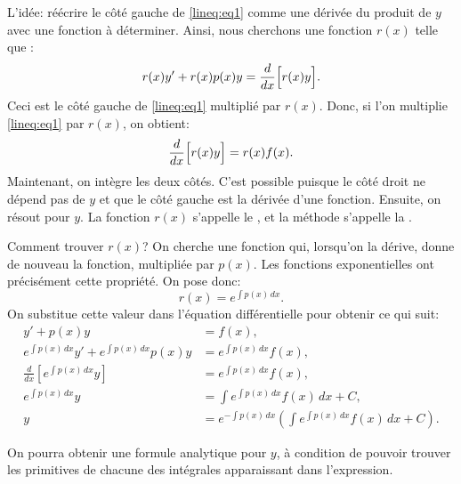 L'idée: réécrire le côté gauche de  \eqref{lineq:eq1} comme une dérivée du produit de $y$ avec une fonction à déterminer.
Ainsi, nous cherchons une fonction $r(x)$ telle que :
\begin{equation*}
	r(x) y' + r(x) p(x) y = \frac{d}{dx}\Bigl[ r(x) y \Bigr].
\end{equation*}
Ceci est le côté gauche de \eqref{lineq:eq1} multiplié par $r(x)$.
Donc, si l'on multiplie \eqref{lineq:eq1} par $r(x)$, on obtient:
\begin{equation*}
	\frac{d}{dx}\Bigl[ r(x) y \Bigr] = r(x)f(x) .
\end{equation*}
Maintenant, on intègre les deux côtés.
C'est possible puisque le côté droit ne dépend pas de $y$ et que le côté gauche est la dérivée d'une fonction.
Ensuite, on résout pour  $y$.
La fonction $r(x)$ s'appelle le \emph{}, et la méthode s'appelle la
\emph{}.

Comment trouver $r(x)$?  On cherche une fonction qui, lorsqu'on la dérive, donne  de nouveau la fonction, multipliée par $p(x)$.
Les fonctions exponentielles ont précisément cette propriété.  On pose donc:
%
\begin{equation*}
r(x) = e^{\int p(x) \,dx} .
\end{equation*}
On substitue cette valeur dans l'équation différentielle pour obtenir ce qui suit:
\begin{align*}
											y' + p(x) y  &= f(x) , \\
	e^{\int p(x) \,dx} y' + e^{\int p(x) \,dx} p(x) y    & = e^{\int p(x) \,dx} f(x) , \\
	\frac{d}{dx}\left[ e^{\int p(x) \,dx} y \right]      & = e^{\int p(x) \,dx} f(x) , \\
									e^{\int p(x) \,dx} y & = \int e^{\int p(x) \,dx} f(x) \,dx + C , \\
													y    & = e^{-\int p(x) \,dx} \left( \int e^{\int p(x) \,dx} f(x) \,dx + C \right) .
\end{align*}

On pourra obtenir une formule analytique pour $y$,
à condition de pouvoir trouver les primitives de chacune des intégrales apparaissant dans l'expression.

